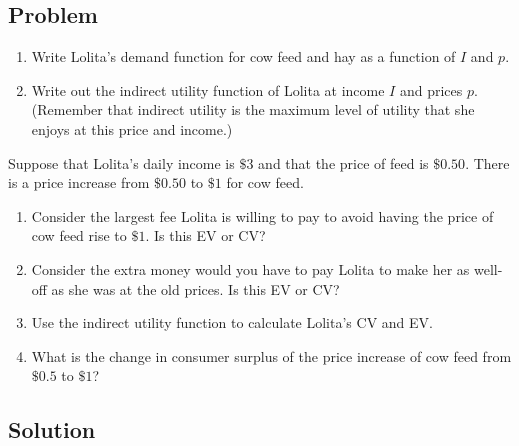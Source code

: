 \documentclass[12pt]{article}
\begin{document}
\subsection{Problem}
\begin{enumerate}[label=(\alph*)]
    \item Write Lolita’s demand function for cow feed and hay as a function of \(I\) and \(p\).
    \item Write out the indirect utility function of Lolita at income \(I\) and prices \(p\). (Remember that indirect utility is the maximum level of utility that she enjoys at this price and income.)
\end{enumerate}

\noindent
Suppose that Lolita’s daily income is \(\$3\) and that the price of feed is \(\$0.50\). There is a price increase from \(\$0.50\) to \(\$1\) for cow feed.

\begin{enumerate}[label=(\alph*),start=3]
    \item Consider the largest fee Lolita is willing to pay to avoid having the price of cow feed rise to \(\$1\). Is this EV or CV?
    \item Consider the extra money would you have to pay Lolita to make her as well-off as she was at the old prices. Is this EV or CV?
    \item Use the indirect utility function to calculate Lolita’s CV and EV.
    \item What is the change in consumer surplus of the price increase of cow feed from \(\$0.5\) to \(\$1\)?
\end{enumerate}

\newpage
\subsection{Solution}
\end{document}
